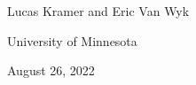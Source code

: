 \documentclass[11pt,aspectratio=169]{beamer}
\begin{document}
\begin{frame}
\begin{center}

{\Large
{}

\vskip 0.25cm
}

\vskip 1cm
Lucas Kramer and Eric Van Wyk

\medskip
University of Minnesota

\bigskip
August 26, 2022

\end{center}
\end{frame}


\end{document}
